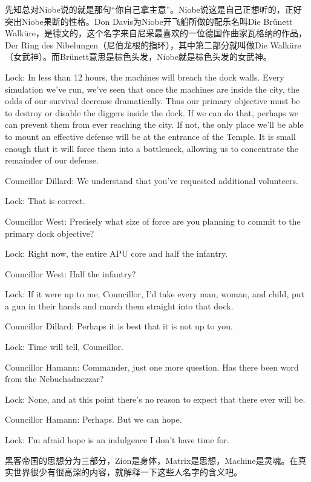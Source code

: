 \documentclass[UTF8]{ctexart}
\newenvironment{myquote}{\color{green} \setlength{\leftskip}{6em} \setlength{\rightskip}{4em} \setlength{\parindent}{-2em}}{\par}
\begin{document}
先知总对Niobe说的就是那句“你自己拿主意”。Niobe说这是自己正想听的，正好突出Niobe果断的性格。Don Davis为Niobe开飞船所做的配乐名叫Die Brünett Walküre，是德文的，这个名字来自尼采最喜欢的一位德国作曲家瓦格纳的作品，Der Ring des Nibelungen（尼伯龙根的指环），其中第二部分就叫做Die Walküre（女武神）。而Brünett意思是棕色头发，Niobe就是棕色头发的女武神。

\begin{myquote}
Lock: In less than 12 hours, the machines will breach the dock walls. Every simulation we've run, we've seen that once the machines are inside the city, the odds of our survival decrease dramatically. Thus our primary objective must be to destroy or disable the diggers inside the dock. If we can do that, perhaps we can prevent them from ever reaching the city. If not, the only place we'll be able to mount an effective defense will be at the entrance of the Temple. It is small enough that it will force them into a bottleneck, allowing us to concentrate the remainder of our defense.

Councillor Dillard: We understand that you've requested additional volunteers.

Lock: That is correct.

Councillor West: Precisely what size of force are you planning to commit to the primary dock objective?

Lock: Right now, the entire APU core and half the infantry.

Councillor West: Half the infantry?

Lock: If it were up to me, Councillor, I'd take every man, woman, and child, put a gun in their hands and march them straight into that dock.

Councillor Dillard: Perhaps it is best that it is not up to you.

Lock: Time will tell, Councillor.

Councillor Hamann: Commander, just one more question. Has there been word from the Nebuchadnezzar?

Lock: None, and at this point there's no reason to expect that there ever will be.

Councillor Hamann: Perhaps. But we can hope.

Lock: I'm afraid hope is an indulgence I don't have time for.
\end{myquote}

黑客帝国的思想分为三部分，Zion是身体，Matrix是思想，Machine是灵魂。在真实世界很少有很高深的内容，就解释一下这些人名字的含义吧。
\end{document}
